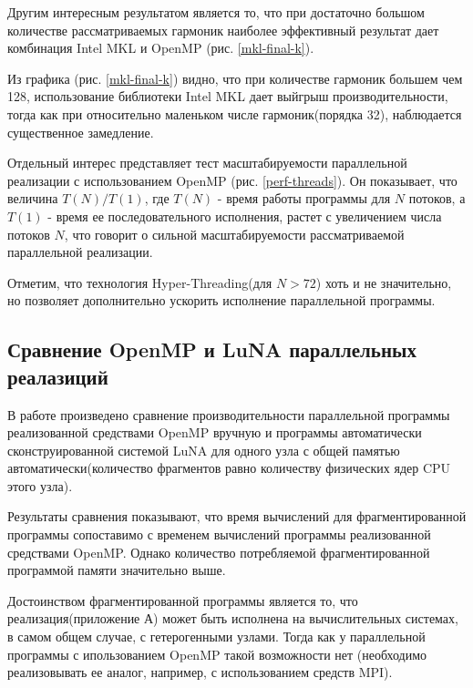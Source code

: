 Другим интересным результатом является то, что при достаточно большом количестве рассматриваемых гармоник
наиболее эффективный результат дает комбинация Intel MKL и OpenMP (рис. \ref{mkl-final-k}).


Из графика (рис. \ref{mkl-final-k}) видно, что при количестве гармоник большем чем 128, использование библиотеки Intel MKL
дает выйгрыш производительности, тогда как при относительно маленьком числе гармоник(порядка 32), наблюдается существенное замедление.

Отдельный интерес представляет тест масштабируемости параллельной реализации с использованием OpenMP (рис. \ref{perf-threads}).
Он показывает, что величина $T(N)/T(1)$, где $T(N)$ - время работы программы для $N$ потоков, а $T(1)$ - время ее последовательного исполнения, растет с увеличением числа потоков $N$, что говорит о сильной масштабируемости рассматриваемой параллельной реализации.


Отметим, что технология Hyper-Threading(для $N>72$) хоть и не значительно, но позволяет дополнительно ускорить исполнение параллельной программы.

\subsection{Сравнение OpenMP и LuNA параллельных реалазиций}
В работе произведено сравнение производительности параллельной программы реализованной средствами OpenMP вручную
и программы автоматически сконструированной системой LuNA для одного узла с общей памятью автоматически(количество фрагментов
равно количеству физических ядер CPU этого узла).

Результаты сравнения показывают, что время вычислений для фрагментированной программы сопоставимо с временем вычислений
программы реализованной средствами OpenMP. Однако количество потребляемой фрагментированной программой памяти значительно выше.

Достоинством фрагментированной программы является то, что реализация(приложение А) может быть исполнена на
вычислительных системах, в самом общем случае, с гетерогенными узлами.
Тогда как у параллельной программы с ипользованием OpenMP такой возможности нет
(необходимо реализовывать ее аналог, например, с использованием средств MPI).

